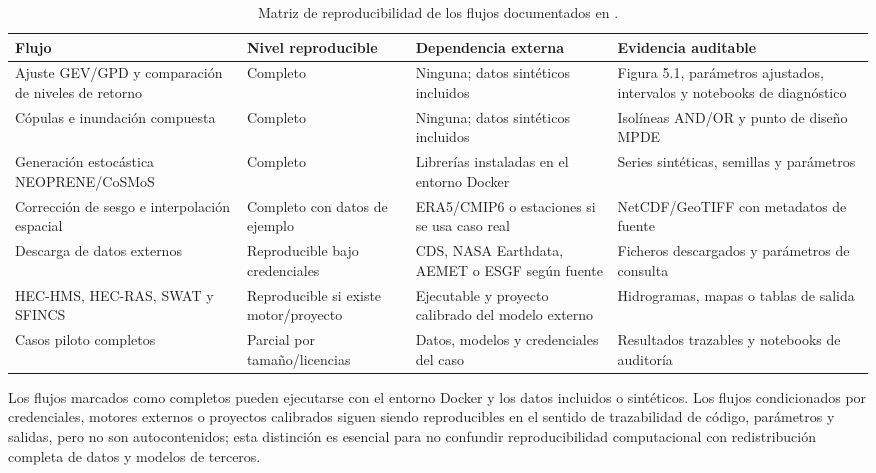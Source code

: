 \begin{table}[htbp]
  \centering
  \footnotesize
  \caption{Matriz de reproducibilidad de los flujos documentados en \hydra.}
  \label{tab:reproducibilidad}
  \begin{tabular}{@{}>{\raggedright\arraybackslash}p{}>{\raggedright\arraybackslash}p{}>{\raggedright\arraybackslash}p{}>{\raggedright\arraybackslash}p{}@{}}
    \toprule
    Flujo & Nivel reproducible & Dependencia externa & Evidencia auditable \\
    \midrule
    Ajuste GEV/GPD y comparación de niveles de retorno & Completo & Ninguna; datos sintéticos incluidos & Figura 5.1, parámetros ajustados, intervalos y notebooks de diagnóstico \\
    Cópulas e inundación compuesta & Completo & Ninguna; datos sintéticos incluidos & Isolíneas AND/OR y punto de diseño MPDE \\
    Generación estocástica NEOPRENE/CoSMoS & Completo & Librerías instaladas en el entorno Docker & Series sintéticas, semillas y parámetros \\
    Corrección de sesgo e interpolación espacial & Completo con datos de ejemplo & ERA5/CMIP6 o estaciones si se usa caso real & NetCDF/GeoTIFF con metadatos de fuente \\
    Descarga de datos externos & Reproducible bajo credenciales & CDS, NASA Earthdata, AEMET o ESGF según fuente & Ficheros descargados y parámetros de consulta \\
    HEC-HMS, HEC-RAS, SWAT y SFINCS & Reproducible si existe motor/proyecto & Ejecutable y proyecto calibrado del modelo externo & Hidrogramas, mapas o tablas de salida \\
    Casos piloto completos & Parcial por tamaño/licencias & Datos, modelos y credenciales del caso & Resultados trazables y notebooks de auditoría \\
    \bottomrule
  \end{tabular}
\end{table}

Los flujos marcados como completos pueden ejecutarse con el entorno Docker y los datos incluidos o sintéticos. Los flujos condicionados por credenciales, motores externos o proyectos calibrados siguen siendo reproducibles en el sentido de trazabilidad de código, parámetros y salidas, pero no son autocontenidos; esta distinción es esencial para no confundir reproducibilidad computacional con redistribución completa de datos y modelos de terceros.

